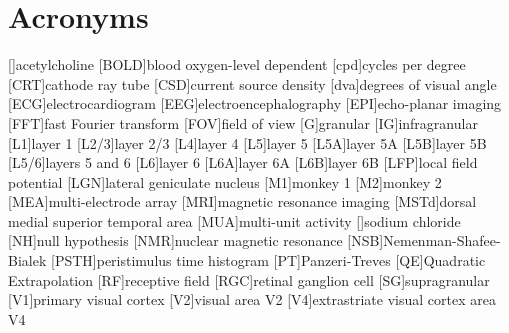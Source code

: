     \chapter*{Acronyms}
    \begin{acronym}[BOLD]
        []{acetylcholine}
        [BOLD]{blood oxygen-level dependent}
        [cpd]{cycles per degree}
        [CRT]{cathode ray tube}
        [CSD]{current source density}
        [dva]{degrees of visual angle}
        [ECG]{electrocardiogram}
        [EEG]{electroencephalography}
        [EPI]{echo-planar imaging}
        [FFT]{fast Fourier transform}
        [FOV]{field of view}
        [G]{granular}
        [IG]{infragranular}
        [L1]{layer 1}
        [L2/3]{layer 2/3}
        [L4]{layer 4}
        [L5]{layer 5}
        [L5A]{layer 5A}
        [L5B]{layer 5B}
        [L5/6]{layers 5 and 6}
        [L6]{layer 6}
        [L6A]{layer 6A}
        [L6B]{layer 6B}
        [LFP]{local field potential}
        [LGN]{lateral geniculate nucleus}
        [M1]{monkey 1}
        [M2]{monkey 2}
        [MEA]{multi-electrode array}
        [MRI]{magnetic resonance imaging}
        [MSTd]{dorsal medial superior temporal area}
        [MUA]{multi-unit activity}
        []{sodium chloride}
        [NH]{null hypothesis}
        [NMR]{nuclear magnetic resonance}
        [NSB]{{N}emenman-{S}hafee-{B}ialek}
        [PSTH]{peristimulus time histogram}
        [PT]{{P}anzeri-{T}reves}
        [QE]{Quadratic Extrapolation}
        [RF]{receptive field}
        [RGC]{retinal ganglion cell}
        [SG]{supragranular}
        [V1]{primary visual cortex}
        [V2]{visual area \acs{V2}}
        [V4]{extrastriate visual cortex area \acs{V4}}
    \end{acronym}                     
\endgroup

\cleardoublepage
